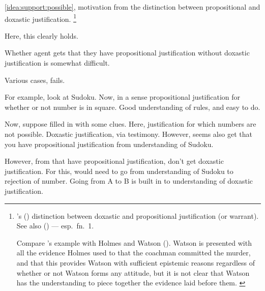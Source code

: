 
\begin{note}
  \autoref{idea:support:possible}, motivation from the distinction between propositional and doxastic justification.%
  \footnote{
    \citeauthor{Firth:1978vi}'s (\citeyear{Firth:1978vi}) distinction between doxastic and propositional justification (or warrant).
    See also \citeauthor{Silva:2020aa} (\citeyear{Silva:2020aa}) --- esp.\ fn.\ 1.

    {\color{red}
      Compare \citeauthor{Firth:1978vi}'s example with Holmes and Watson (\citeyear[218]{Firth:1978vi}).
      Watson is presented with all the evidence Holmes used to that the coachman committed the murder, and that this provides Watson with sufficient epistemic reasons regardless of whether or not Watson forms any attitude, but it is not clear that Watson has the understanding to piece together the evidence laid before them.
    }
  }

  Here, this clearly holds.

  Whether agent gets that they have propositional justification without doxastic justification is somewhat difficult.

  Various cases, fails.

  For example, look at Sudoku.
  Now, in a sense propositional justification for whether or not number is in square.
  Good understanding of rules, and easy to do.

  Now, suppose filled in with some clues.
  Here, justification for which numbers are not possible.
  Doxastic justification, via testimony.
  However, seems also get that you have propositional justification from understanding of Sudoku.

  However, from that have propositional justification, don't get doxastic justification.
  For this, would need to go from understanding of Sudoku to rejection of number.
  Going from A to B is built in to understanding of doxastic justification.
\end{note}

